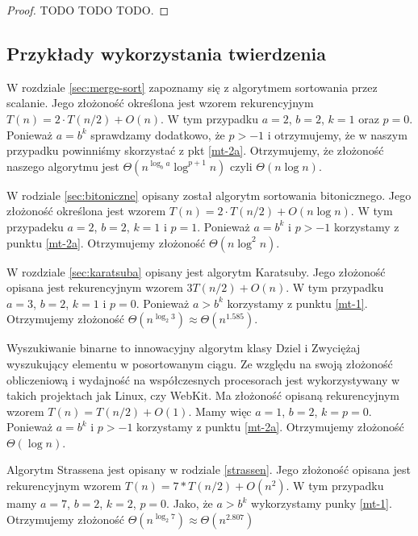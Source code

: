 \begin{proof}
 TODO TODO TODO.
\end{proof}

\subsection{Przykłady wykorzystania twierdzenia}

W rozdziale \ref{sec:merge-sort} zapoznamy się z algorytmem sortowania przez scalanie.
Jego złożoność określona jest wzorem rekurencyjnym $T(n) = 2 \cdot T(n/2) + O(n)$.
W tym przypadku $a = 2$, $b = 2$, $k = 1$ oraz $p = 0$.
Ponieważ $a = b^k$ sprawdzamy dodatkowo, że $p > -1$ i otrzymujemy, że w naszym przypadku powinniśmy skorzystać z pkt \ref{mt-2a}.
Otrzymujemy, że złożoność naszego algorytmu jest $\Theta(n^{\log_b a} \log^{p + 1} n)$ czyli $\Theta(n\log n)$.

W rodziale \ref{sec:bitoniczne} opisany został algorytm sortowania bitonicznego.
Jego złożoność określona jest wzorem $T(n) = 2 \cdot T(n/2) + O(n \log n)$.
W tym przypadeku $a = 2$, $b = 2$, $k=1$ i $p = 1$.
Ponieważ $a = b^k$ i $p > -1$ korzystamy z punktu \ref{mt-2a}.
Otrzymujemy złożoność $\Theta(n \log^2 n)$.

W rozdziale \ref{sec:karatsuba} opisany jest algorytm Karatsuby. Jego złożoność opisana jest rekurencyjnym wzorem $3 T(n/2) + O(n)$.
W tym przypadku $a = 3$, $b = 2$, $k=1$ i $p=0$.
Ponieważ $a > b^k$ korzystamy z punktu \ref{mt-1}.
Otrzymujemy złożoność $\Theta(n^{\log_{2} 3}) \approx \Theta(n^{1.585}).$

Wyszukiwanie binarne to innowacyjny algorytm klasy Dziel i Zwyciężaj wyszukujący elementu w posortowanym ciągu.
Ze względu na swoją złożoność obliczeniową i wydajność na współczesnych procesorach jest wykorzystywany w takich projektach jak Linux, czy WebKit.
Ma złożoność opisaną rekurencyjnym wzorem $T(n) = T(n/2) + O(1)$.
Mamy więc $a = 1$, $b = 2$, $k = p = 0$.
Ponieważ $a = b^k$ i $p > -1$ korzystamy z punktu \ref{mt-2a}.
Otrzymujemy złożoność $\Theta(\log n)$.

Algorytm Strassena jest opisany w rodziale \ref{strassen}.
Jego złożoność opisana jest rekurencyjnym wzorem $T(n) = 7 * T(n/2) + O(n^2)$.
W tym przypadku mamy $a = 7$, $b = 2$, $k = 2$, $p = 0$.
Jako, że $a > b^k$ wykorzystamy punky \ref{mt-1}.
Otrzymujemy złożoność $\Theta(n^{\log_{2} 7}) \approx \Theta(n^2.807)$
